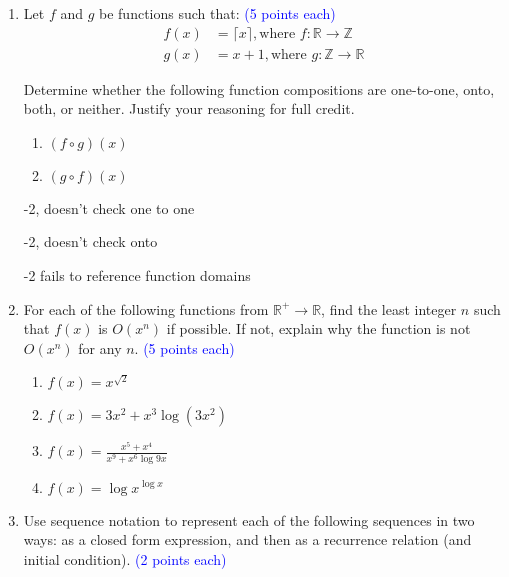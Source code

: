 \documentclass{article}
\newcommand{\pte}[1]{\textcolor{blue}{(#1 points each)}}
\newenvironment{rubric}
{
\par
\begin{spacing}{.6}
\begin{itshape}
\color{red}

}
{
\end{itshape}
\end{spacing}
\par
}
\begin{document}
\begin{enumerate}
\begin{rubric}
-5, fails to reference conjunction or disjunction (and/or)

-5, missing direction ($x \in $ LHS or $x \in $ RHS) for set equality

-1, per skipped/missing steps

-2, missing conclusion
\end{rubric}

\item Let $f$ and $g$ be functions such that: \pte{5}
\begin{align*}
    f(x) &= \lceil x \rceil, \text{where } f : \mathbb{R} \rightarrow \mathbb{Z}\\
    g(x) &= x+1, \text{where } g : \mathbb{Z} \rightarrow \mathbb{R}
 \end{align*}

Determine whether the following function compositions are one-to-one, onto, both, or neither. Justify your reasoning for full credit.

\begin{enumerate}
    \item $(f \circ g)(x)$
    \item $(g \circ f)(x)$
\end{enumerate}

\begin{rubric}
    -2, doesn't check one to one
    
    -2, doesn't check onto
    
    -2 fails to reference function domains
\end{rubric}

\item For each of the following functions from $\mathbb{R}^+ \rightarrow \mathbb{R}$, find the least integer $n$ such that $f(x)$ is $O(x^n)$ if possible. If not, explain why the function is not $O(x^n)$ for any $n$. \pte{5}

\begin{enumerate}
    \item $f(x) = x^{\sqrt{2}}$
    \item $f(x) = 3x^2 + x^3\log(3x^2)$
    \item $f(x) = \frac{x^5 + x^4}{x^9 + x^6\log9x}$
    \item $f(x) = \log x^{\log x}$
\end{enumerate}

\item Use sequence notation to represent each of the following sequences in two ways: as a closed form expression, and then as a recurrence relation (and initial condition). \pte{2}


\end{enumerate}
\end{document}
